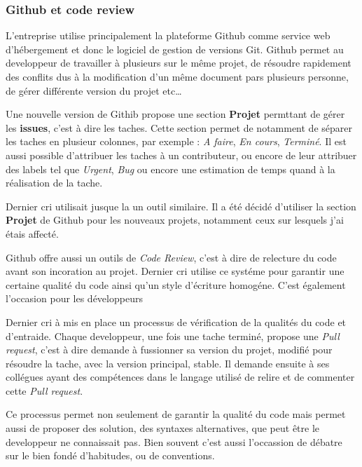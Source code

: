 \subsubsection{Github et code review}\label{github-et-code-review}

\bigskip

L'entreprise utilise principalement la plateforme Github comme service
web d'hébergement et donc le logiciel de gestion de versions Git. Github
permet au developpeur de travailler à plusieurs sur le même projet, de
résoudre rapidement des conflits dus à la modification d'un même
document pars plusieurs personne, de gérer différente version du projet
etc\ldots{}

\bigskip

Une nouvelle version de Githib propose une section \textbf{Projet}
permttant de gérer les \textbf{issues}, c'est à dire les taches. Cette
section permet de notamment de séparer les taches en plusieur colonnes,
par exemple : \emph{A faire}, \emph{En cours}, \emph{Terminé}. Il est
aussi possible d'attribuer les taches à un contributeur, ou encore de
leur attribuer des labels tel que \emph{Urgent}, \emph{Bug} ou encore
une estimation de temps quand à la réalisation de la tache.

\bigskip

Dernier cri utilisait jusque la un outil similaire. Il a été décidé
d'utiliser la section \textbf{Projet} de Github pour les nouveaux
projets, notamment ceux sur lesquels j'ai étais affecté.

\bigskip

Github offre aussi un outils de \emph{Code Review}, c'est à dire de
relecture du code avant son incoration au projet. Dernier cri utilise ce
systéme pour garantir une certaine qualité du code ainsi qu'un style
d'écriture homogéne. C'est également l'occasion pour les développeurs

\bigskip

Dernier cri à mis en place un processus de vérification de la qualités
du code et d'entraide. Chaque developpeur, une fois une tache terminé,
propose une \emph{Pull request}, c'est à dire demande à fussionner sa
version du projet, modifié pour résoudre la tache, avec la version
principal, stable. Il demande ensuite à ses collégues ayant des
compétences dans le langage utilisé de relire et de commenter cette
\emph{Pull request}.

\bigskip

Ce processus permet non seulement de garantir la qualité du code mais
permet aussi de proposer des solution, des syntaxes alternatives, que
peut être le developpeur ne connaissait pas. Bien souvent c'est aussi
l'occassion de débatre sur le bien fondé d'habitudes, ou de conventions.

